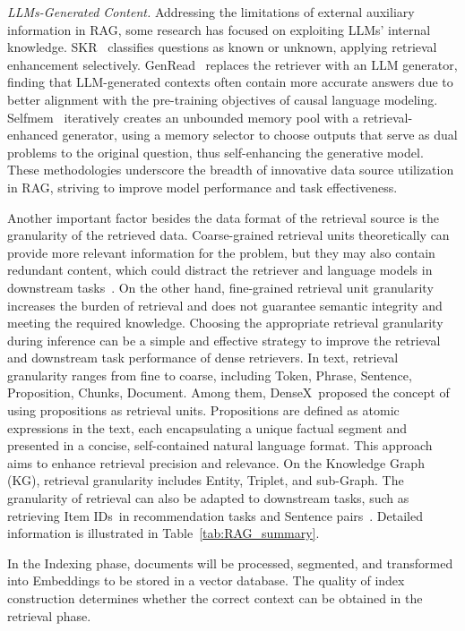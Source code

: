 \emph{LLMs-Generated Content.} Addressing the limitations of external auxiliary information in RAG, some research has focused on exploiting LLMs' internal knowledge. SKR~ classifies questions as known or unknown, applying retrieval enhancement selectively. GenRead~ replaces the retriever with an LLM generator, finding that LLM-generated contexts often contain more accurate answers due to better alignment with the pre-training objectives of causal language modeling. Selfmem~ iteratively creates an unbounded memory pool with a retrieval-enhanced generator, using a memory selector to choose outputs that serve as dual problems to the original question, thus self-enhancing the generative model. These methodologies underscore the breadth of innovative data source utilization in RAG, striving to improve model performance and task effectiveness.

Another important factor besides the data format of the retrieval source is the granularity of the retrieved data. Coarse-grained retrieval units theoretically can provide more relevant information for the problem, but they may also contain redundant content, which could distract the retriever and language models in downstream tasks~. On the other hand,  fine-grained retrieval unit granularity increases the burden of retrieval  and does not guarantee semantic integrity and meeting the required knowledge. Choosing the appropriate retrieval granularity during inference can be a simple and effective strategy to improve the retrieval and downstream task performance of dense retrievers.
In text, retrieval granularity ranges from fine to coarse, including Token, Phrase, Sentence, Proposition, Chunks, Document. Among them, DenseX~proposed the concept of using propositions as retrieval units. Propositions are defined as atomic expressions in the text, each encapsulating a unique factual segment and presented in a concise, self-contained natural language format. This approach aims to enhance retrieval precision and relevance. On the Knowledge Graph (KG), retrieval granularity includes Entity, Triplet, and sub-Graph. The granularity of retrieval can also be adapted to downstream tasks, such as retrieving Item IDs~in recommendation tasks and Sentence pairs~. Detailed information is illustrated in Table~\ref{tab:RAG_summary}.

In the Indexing phase, documents will be processed, segmented, and transformed into Embeddings to be stored in a vector database. The quality of index construction determines whether the correct context can be obtained in the  retrieval phase.

